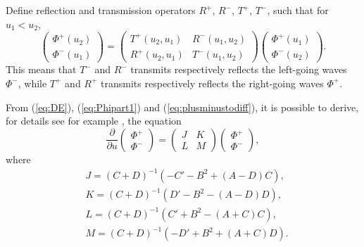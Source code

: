 \documentclass{kluwer}
\renewcommand{\Phi}{\varPhi}
\renewcommand{\vec}[1]{\bm{#1}}
\newcommand{\pd}[2]{\dfrac{\partial#1}{\partial#2}}
\renewcommand{\Phi}{\varPhi}
\begin{document}
\begin{article}
Define reflection and transmission
operators $R^+$, $R^-$, $T^+$, $T^-$, such that for $u_1<u_2$,
\begin{equation}
  \label{eq:RT}
  \begin{pmatrix}
    \vec\Phi^+(u_2)\\
    \vec\Phi^-(u_1)
  \end{pmatrix}=
  \begin{pmatrix}
    T^+(u_2,u_1)&R^-(u_1,u_2)\\
    R^+(u_2,u_1)&T^-(u_1,u_2)
  \end{pmatrix}
  \begin{pmatrix}
    \vec\Phi^+(u_1)\\
    \vec\Phi^-(u_2)
  \end{pmatrix}.
\end{equation}
This means that $T^-$ and $R^-$ transmits respectively reflects the
left-going waves $\vec\Phi^-$, while $T^+$ and $R^+$ transmits
respectively reflects the right-going waves $\vec\Phi^+$.


From (\ref{eq:DE}), (\ref{eq:Phipart1}) and
(\ref{eq:plusminustodiff}), it is possible to derive, for details see
for example \cite{Nilsson:2002}, the equation
\begin{equation}
  \label{eq:diffphiplusminus}
  \pd{}u
  \begin{pmatrix}
    \vec\Phi^+\\\vec\Phi^-
  \end{pmatrix}
  =
  \begin{pmatrix}
    J&K\\
    L&M
  \end{pmatrix}
  \begin{pmatrix}
    \vec\Phi^+\\\vec\Phi^-
  \end{pmatrix},
\end{equation}
where
\begin{equation}
  \label{eq:alphabeta}
  \begin{split}
    &J=(C+D)^{-1}\left(-C'-B^2+(A-D)C\right),\\
    &K=(C+D)^{-1}\left(D'-B^2-(A-D)D\right),\\
    &L=(C+D)^{-1}\left(C'+B^2-(A+C)C\right),\\
    &M=(C+D)^{-1}\left(-D'+B^2+(A+C)D\right).
  \end{split}
\end{equation}


\end{article}
\end{document}
